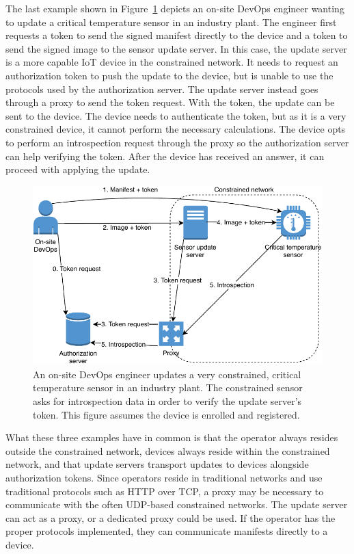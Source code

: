 \documentclass[0-thesis.tex]{subfiles}
\begin{document}
The last example shown in Figure~\ref{fig:industry} depicts an on-site DevOps engineer
wanting to update a critical temperature sensor in an industry plant. The engineer first
requests a token to send the signed manifest directly to the device and a token to send
the signed image to the sensor update server. In this case, the update server is a more
capable IoT device in the constrained network. It needs to request an authorization token
to push the update to the device, but is unable to use the protocols used by the
authorization server. The update server instead goes through a proxy to send the token
request. With the token, the update can be sent to the device. The device needs to
authenticate the token, but as it is a very constrained device, it cannot perform the
necessary calculations. The device opts to perform an introspection request through the
proxy so the authorization server can help verifying the token. After the device has
received an answer, it can proceed with applying the update.

\begin{figure}[t]
    \caption[An on-site DevOps engineer updates a very constrained, critical temperature
    sensor in an industry plant.]
        {An on-site DevOps engineer updates a very constrained, critical temperature
                sensor in an industry plant. The constrained sensor asks for introspection
                data in order to verify the update server's token. This figure assumes the device is enrolled and registered.}
    \label{fig:industry}
    \includegraphics{images/use-case-industry.pdf}
\end{figure}

What these three examples have in common is that the operator always resides outside the
constrained network, devices always reside within the constrained network, and that update
servers transport updates to devices alongside authorization tokens. Since operators
reside in traditional networks and use traditional protocols such as HTTP over TCP, a
proxy may be necessary to communicate with the often UDP-based constrained networks. The
update server can act as a proxy, or a dedicated proxy could be used. If the operator has
the proper protocols implemented, they can communicate manifests directly to a device.
\end{document}
